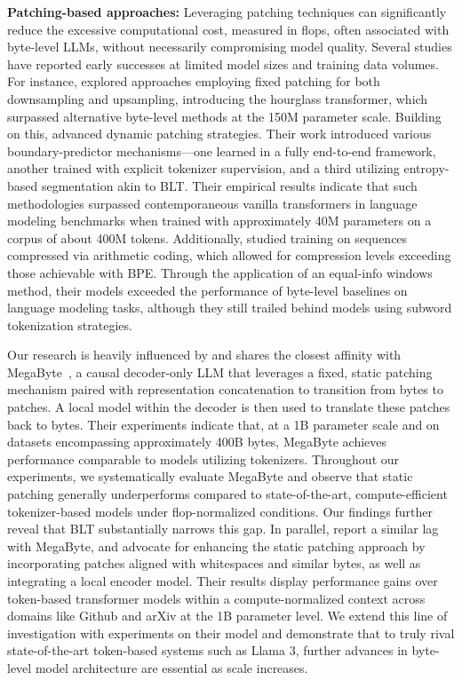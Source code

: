 \textbf{Patching-based approaches:} Leveraging patching techniques can significantly reduce the excessive computational cost, measured in flops, often associated with byte-level LLMs, without necessarily compromising model quality. Several studies have reported early successes at limited model sizes and training data volumes. For instance, \cite{nawrot-etal-2022-hierarchical} explored approaches employing fixed patching for both downsampling and upsampling, introducing the hourglass transformer, which surpassed alternative byte-level methods at the 150M parameter scale. Building on this, \cite{nawrot-etal-2023-efficient} advanced dynamic patching strategies. Their work introduced various boundary-predictor mechanisms—one learned in a fully end-to-end framework, another trained with explicit tokenizer supervision, and a third utilizing entropy-based segmentation akin to {\textsc BLT}. Their empirical results indicate that such methodologies surpassed contemporaneous vanilla transformers in language modeling benchmarks when trained with approximately 40M parameters on a corpus of about 400M tokens. Additionally, \cite{lester2024training} studied training on sequences compressed via arithmetic coding, which allowed for compression levels exceeding those achievable with BPE. Through the application of an equal-info windows method, their models exceeded the performance of byte-level baselines on language modeling tasks, although they still trailed behind models using subword tokenization strategies.

Our research is heavily influenced by and shares the closest affinity with MegaByte~\citep{yu2023megabyte}, a causal decoder-only LLM that leverages a fixed, static patching mechanism paired with representation concatenation to transition from bytes to patches. A local model within the decoder is then used to translate these patches back to bytes. Their experiments indicate that, at a 1B parameter scale and on datasets encompassing approximately 400B bytes, MegaByte achieves performance comparable to models utilizing tokenizers. Throughout our experiments, we systematically evaluate MegaByte and observe that static patching generally underperforms compared to state-of-the-art, compute-efficient tokenizer-based models under flop-normalized conditions. Our findings further reveal that {\textsc BLT} substantially narrows this gap. In parallel, \cite{slagle2024spacebyte} report a similar lag with MegaByte, and advocate for enhancing the static patching approach by incorporating patches aligned with whitespaces and similar bytes, as well as integrating a local encoder model. Their results display performance gains over token-based transformer models within a compute-normalized context across domains like Github and arXiv at the 1B parameter level. We extend this line of investigation with experiments on their model and demonstrate that to truly rival state-of-the-art token-based systems such as Llama 3, further advances in byte-level model architecture are essential as scale increases.

